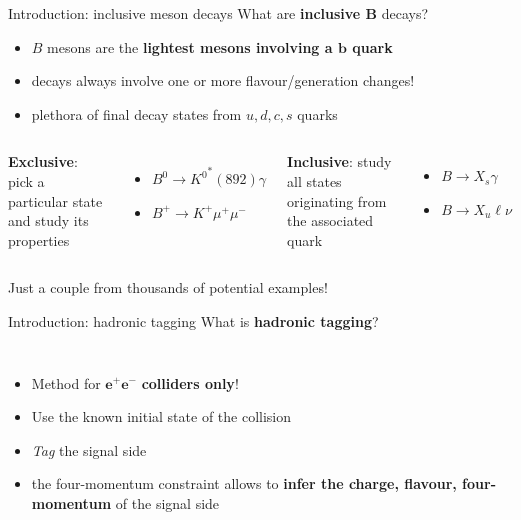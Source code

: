 \documentclass[xcolor=dvipsnames]{beamer}
\begin{document}
\begin{frame}{Introduction: inclusive \safeB meson decays}
   \centering\scriptsize
   {\normalsize What are \textbf{inclusive $\bm{B}$} decays?}

   \begin{itemize}
      \item $B$ mesons are the \textbf{lightest mesons involving a $\bm{b}$ quark}
      \item[\ra] decays always involve one or more flavour/generation changes!
      \item[\ra] plethora of final decay states from $u, d, c, s$ quarks
   \end{itemize}

   \vspace{10pt}

   \begin{columns}
      \centering
         \textbf{Exclusive}: pick a particular state and study its properties
            \begin{itemize}
               \item $B^0\to{K^0}^*(892)\gamma$
               \item $B^+\to K^+\mu^+\mu^-$
            \end{itemize}
      \centering
         \textbf{Inclusive}: study all states originating from the associated quark
         \begin{itemize}
            \item $B\to X_s \gamma$
            \item $B\to X_u \ell \nu$
         \end{itemize}
   \end{columns}
   
   \vspace{10pt}
   Just a couple from thousands of potential examples!

\end{frame}

\begin{frame}{Introduction: hadronic tagging}
\centering\scriptsize
{\normalsize What is \textbf{hadronic tagging}?}

\vspace{10pt}

\begin{columns}
   

   \begin{itemize}
      \item Method for $\boldsymbol{e^+}\boldsymbol{e^-}$ \textbf{colliders only}!
      \item Use the known initial state of the \epem collision
      \item \textit{Tag} the signal side
      \item the four-momentum constraint allows to \textbf{infer the charge, flavour, four-momentum} of the signal side
   \end{itemize}
\end{columns}


\end{frame}
\end{document}
